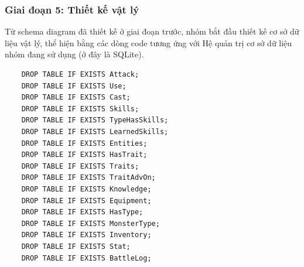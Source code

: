 \subsubsection{Giai đoạn 5: Thiết kế vật lý}
\hspace*{0.5cm} Từ schema diagram đã thiết kế ở giai đoạn trước, nhóm bắt đầu thiết kế cơ sở dữ liệu vật lý, thể hiện bằng các dòng code tương ứng với Hệ quản trị cơ sở dữ liệu nhóm đang sử dụng (ở đây là SQLite).\\
\begin{verbatim}
	DROP TABLE IF EXISTS Attack;
	DROP TABLE IF EXISTS Use;
	DROP TABLE IF EXISTS Cast;
	DROP TABLE IF EXISTS Skills;
	DROP TABLE IF EXISTS TypeHasSkills;
	DROP TABLE IF EXISTS LearnedSkills;
	DROP TABLE IF EXISTS Entities;
	DROP TABLE IF EXISTS HasTrait;
	DROP TABLE IF EXISTS Traits;
	DROP TABLE IF EXISTS TraitAdvOn;
	DROP TABLE IF EXISTS Knowledge;
	DROP TABLE IF EXISTS Equipment;
	DROP TABLE IF EXISTS HasType;
	DROP TABLE IF EXISTS MonsterType;
	DROP TABLE IF EXISTS Inventory;
	DROP TABLE IF EXISTS Stat;
	DROP TABLE IF EXISTS BattleLog;
	

\end{verbatim}
